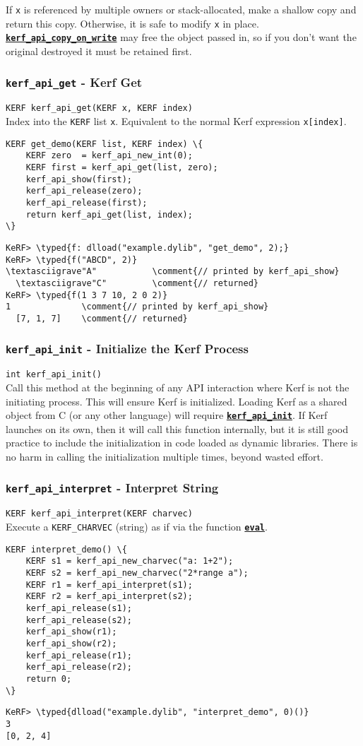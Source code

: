 \documentclass{article}
\newcommand{\typed}[1]{\textcolor{TealBlue}{#1}}
\newcommand{\comment}[1]{\textcolor{Orange}{#1}}
\newcommand{\primu}[2]{\hyperref[prim:#2]{\textbf{\texttt{#1}}}}
\newcommand{\prim}[1]{\primu{#1}{#1}}
\newcommand{\ffidef}[3]{\subsubsection{\texttt{#1} - #2}\label{ffi:#3}}
\newcommand{\ffi}[2]{\hyperref[ffi:#2]{\textbf{\texttt{#1}}}}
\begin{document}
If \texttt{x} is referenced by multiple owners or stack-allocated, make a shallow copy and return this copy. Otherwise, it is safe to modify \texttt{x} in place. \ffi{kerf\_api\_copy\_on\_write}{kerfApiCopyOnWrite} may free the object passed in, so if you don't want the original destroyed it must be retained first.

\pagebreak
\ffidef{kerf\_api\_get}{Kerf Get}{kerfApiGet}
\texttt{KERF kerf\_api\_get(KERF x, KERF index)}\\

Index into the \texttt{KERF} list \texttt{x}. Equivalent to the normal Kerf expression \texttt{x[index]}.
\begin{Verbatim}
KERF get_demo(KERF list, KERF index) \{
	KERF zero  = kerf_api_new_int(0);
	KERF first = kerf_api_get(list, zero);
	kerf_api_show(first);
	kerf_api_release(zero);
	kerf_api_release(first);
	return kerf_api_get(list, index);
\}
\end{Verbatim}
\begin{Verbatim}
KeRF> \typed{f: dlload("example.dylib", "get_demo", 2);}
KeRF> \typed{f("ABCD", 2)}
\textasciigrave"A"           \comment{// printed by kerf_api_show}
  \textasciigrave"C"         \comment{// returned}
KeRF> \typed{f(1 3 7 10, 2 0 2)}
1              \comment{// printed by kerf_api_show}
  [7, 1, 7]    \comment{// returned}
\end{Verbatim}

\ffidef{kerf\_api\_init}{Initialize the Kerf Process}{kerfApiInit}
\texttt{int kerf\_api\_init()}\\

Call this method at the beginning of any API interaction where Kerf is not the initiating process. This will ensure Kerf is initialized. Loading Kerf as a shared object from C (or any other language) will require \ffi{kerf\_api\_init}{kerfApiInit}. If Kerf launches on its own, then it will call this function internally, but it is still good practice to include the initialization in code loaded as dynamic libraries. There is no harm in calling the initialization multiple times, beyond wasted effort.

\pagebreak

\ffidef{kerf\_api\_interpret}{Interpret String}{kerfApiInterpret}
\texttt{KERF kerf\_api\_interpret(KERF charvec)}\\

Execute a \texttt{KERF\_CHARVEC} (string) as if via the function \prim{eval}.
\begin{Verbatim}
KERF interpret_demo() \{
	KERF s1 = kerf_api_new_charvec("a: 1+2");
	KERF s2 = kerf_api_new_charvec("2*range a");
	KERF r1 = kerf_api_interpret(s1);
	KERF r2 = kerf_api_interpret(s2);
	kerf_api_release(s1);
	kerf_api_release(s2);
	kerf_api_show(r1);
	kerf_api_show(r2);
	kerf_api_release(r1);
	kerf_api_release(r2);
	return 0;
\}
\end{Verbatim}
\begin{Verbatim}
KeRF> \typed{dlload("example.dylib", "interpret_demo", 0)()}
3
[0, 2, 4]
\end{Verbatim}
\end{document}
